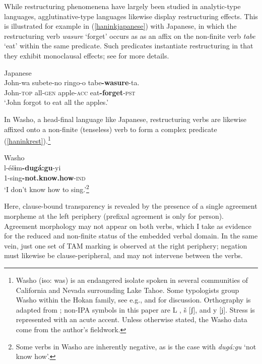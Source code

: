 \documentclass[output=paper]{langscibook}
\begin{document}
 While restructuring phenomenena have largely been studied in analytic-type languages, agglutinative-type languages likewise display restructuring effects. This is  illustrated for example in (\ref{haninkjapanese}) with Japanese, in which the restructuring verb {\itshape wasure} `forget' occurs as as an affix on the non-finite verb {\itshape tabe} `eat' within the same predicate. Such predicates instantiate restructuring in that they exhibit monoclausal effects; see \citealt{shimamurawurmbrand2014} for more details.



\ea Japanese\\
\gll 
 John-wa subete-no ringo-o tabe\textbf{-wasure}-ta.\\
John-{\scshape top} all-{\scshape gen} apple-{\scshape acc} eat\textbf{-forget}-{\scshape pst}\\
\glt `John forgot to eat all the apples.' \hfill \citep[2]{shimamurawurmbrand2014} \label{haninkjapanese}
\z

 
 In Washo, a head-final language like Japanese, restructuring verbs are likewise affixed onto a non-finite (tenseless) verb to form a complex predicate (\ref{haninkrest}).\footnote{Washo (iso: was) is an endangered isolate spoken in several communities of California and Nevada surrounding Lake Tahoe. Some typologists group Washo within the Hokan family, see e.g., \cite{campbell1997} and \cite{mithun1999} for discussion. Orthography is adapted from \cite{jacobsen1964}; non-IPA symbols in this paper are L \textipa{[\r*l]}, š [ʃ], and y [j]. Stress is represented with an acute accent. Unless otherwise stated, the Washo data come from the author's fieldwork.} 
 
 \ea\label{haninkrest} Washo\\
 \gll l-éšɨm\textbf{-dugá:gu}-yi\\
1-sing\textbf{-not.know.how}-\textsc{ind}\\ 
\glt `I don't know how to sing.'\footnote{Some verbs in Washo are inherently negative, as is the case with {\itshape dugá:gu} `not know how'.} 
\z 
 
\noindent Here, clause-bound transparency is revealed by the presence of a single agreement morpheme at the left periphery (prefixal agreement is only for person). Agreement morphology may not appear on both verbs, which I take as evidence for the reduced and non-finite status of the embedded verbal domain. In the same vein, just one set of TAM marking is observed at the right periphery;  negation must likewise be clause-peripheral, and may not intervene between the verbs.
\end{document}
